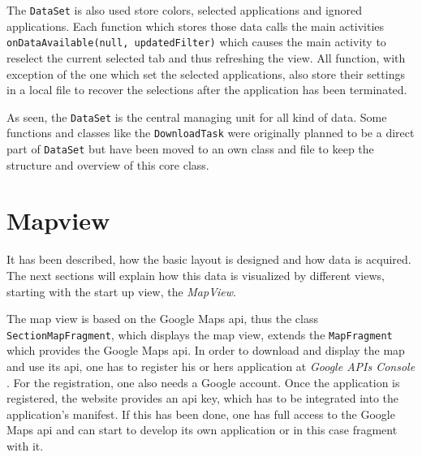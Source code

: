 The \lstinline$DataSet$ is also used store colors, selected applications and ignored applications. Each function which stores those data calls the main activities \lstinline$onDataAvailable(null, updatedFilter)$ which causes the main activity to reselect the current selected tab and thus refreshing the view. All function, with exception of the one which set the selected applications, also store their settings in a local file to recover the selections after the application has been terminated.

As seen, the \lstinline$DataSet$ is the central managing unit for all kind of data. Some functions and classes like the \lstinline$DownloadTask$ were originally planned to be a direct part of \lstinline$DataSet$ but have been moved to an own class and file to keep the structure and overview of this core class.
\newpage
\section{Mapview}
It has been described, how the basic layout is designed and how data is acquired. The next sections will explain how this data is visualized by different views, starting with the start up view, the \emph{MapView}.

The  map view is based on the Google Maps api, thus the class \lstinline$SectionMapFragment$, which displays the map view, extends the \lstinline$MapFragment$ which provides the Google Maps api. In order to download and display the map and use its api, one has to register his or hers application at \emph{Google APIs Console} \cite{googleapi}. For the registration, one also needs a Google account. Once the application is registered, the website provides an api key, which has to be integrated into the application's manifest. If this has been done, one has full access to the Google Maps api and can start to develop its own application or in this case fragment with it.

